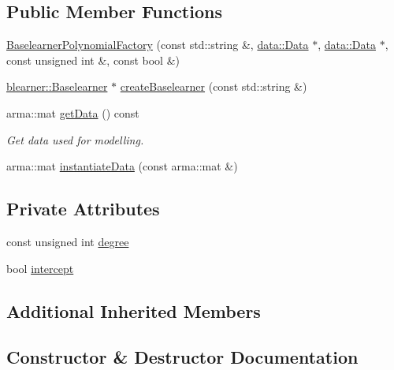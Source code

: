 \subsection*{Public Member Functions}
\begin{DoxyCompactItemize}
\item 
\mbox{\hyperlink{classblearnerfactory_1_1_baselearner_polynomial_factory_aaa0dbb3dab4a98dfb1835998fc3ffa50}{Baselearner\+Polynomial\+Factory}} (const std\+::string \&, \mbox{\hyperlink{classdata_1_1_data}{data\+::\+Data}} $\ast$, \mbox{\hyperlink{classdata_1_1_data}{data\+::\+Data}} $\ast$, const unsigned int \&, const bool \&)
\item 
\mbox{\hyperlink{classblearner_1_1_baselearner}{blearner\+::\+Baselearner}} $\ast$ \mbox{\hyperlink{classblearnerfactory_1_1_baselearner_polynomial_factory_a18095806fa93e6ac2159e966ededc1cf}{create\+Baselearner}} (const std\+::string \&)
\item 
arma\+::mat \mbox{\hyperlink{classblearnerfactory_1_1_baselearner_polynomial_factory_af6d997c89f2e81a490352f23dee1ef9d}{get\+Data}} () const
\begin{DoxyCompactList}\small\item\em Get data used for modelling. \end{DoxyCompactList}\item 
arma\+::mat \mbox{\hyperlink{classblearnerfactory_1_1_baselearner_polynomial_factory_ae8a2c70c75eb37e6c782d1bb17627272}{instantiate\+Data}} (const arma\+::mat \&)
\end{DoxyCompactItemize}
\subsection*{Private Attributes}
\begin{DoxyCompactItemize}
\item 
const unsigned int \mbox{\hyperlink{classblearnerfactory_1_1_baselearner_polynomial_factory_a09e03424857dc2d345af9ac98173b74c}{degree}}
\item 
bool \mbox{\hyperlink{classblearnerfactory_1_1_baselearner_polynomial_factory_acb53ec3a5ea73dac4cb157ea1cf641d2}{intercept}}
\end{DoxyCompactItemize}
\subsection*{Additional Inherited Members}


\subsection{Constructor \& Destructor Documentation}
\mbox{\label{classblearnerfactory_1_1_baselearner_polynomial_factory_aaa0dbb3dab4a98dfb1835998fc3ffa50}} 
